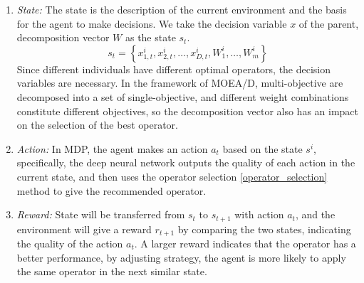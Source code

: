 \documentclass[journal]{IEEEtran}
\newcommand{\TODO}[1]{\textcolor[rgb]{1.00,0.40,0.22}{#1}}
\begin{document}
\begin{enumerate}
    \item \textit{State:}
          The state is the description of the current environment and the basis for the agent to make decisions. We take the decision variable $x$ of the parent, decomposition vector $W$ as the state $s_t$.
          \begin{equation}
              s_{t}=\left\{x_{1,t}^i, x_{2,t}^i, \ldots, x_{D,t}^i, W_{1}^{i}, \ldots, W_{m}^{i}\right\}
          \end{equation}
          Since different individuals have different optimal operators, the decision variables are necessary. In the framework of MOEA/D, multi-objective are decomposed into a set of single-objective, and different weight combinations constitute different objectives, so the decomposition vector also has an impact on the selection of the best operator.
    \item \textit{Action:}
          In MDP, the agent makes an action $a_t$ based on the state $s^i$, specifically, the deep neural network outputs the quality of each action in the current state, and then uses the operator selection \ref{operator_selection} method to give the recommended operator.
    \item \textit{Reward:}
          State will be transferred from $s_{t}$ to $s_{t+1}$ with action $a_t$, and the environment will give a reward $r_{t+1}$ by comparing the two states, indicating the quality of the action $a_t$. A larger reward indicates that the operator has a better performance, by adjusting strategy, the agent is more likely to apply the same operator in the next similar state.
\end{enumerate}
\end{document}
